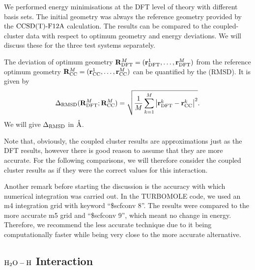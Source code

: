 \documentclass[8.5pt,twoside,twocolumn]{article}
\newcommand\dft{\enmat{_{\te{DFT}}}}
\newcommand\cc{\enmat{_{\te{CC}}}}
\renewcommand{\Ang}{\mathring{\te{A}}}
\renewcommand\r{\bo r}
\theoremstyle{standard}
\begin{document}
We performed energy minimisations at the DFT level of theory with different basis sets. The initial
geometry was always the reference geometry provided by the $\text{CCSD(T)-F12A}$ calculation. The results can be compared
to the coupled-cluster data with respect to optimum geometry and energy deviations. We will discuss
these for the three test systems separately.

The deviation of optimum geometry \mbox{$\bo R^M\dft=(\r^1\dft,\ldots,\r^M\dft)$} from the reference optimum geometry 
\mbox{$\bo R^M\cc=(\r^1\cc,\ldots,\r^M\cc)$} can be quantified by the  (RMSD). It
is given by
\newcommand{\DRMSD}{\Dl_{\te{RMSD}}}
\begin{equation}
\Dl_{\te{RMSD}}(\bo R^M\dft;\bo R^M\cc)=\sqrt{\frac 1 M \sum_{k=1}^M \abs{\r^k\dft-\r^k\cc}^2}.
\label{Bench:RMSD}
\end{equation}
We will give $\DRMSD$ in $\Ang$.   

Note that, obviously, the coupled cluster results are approximations just as the DFT results, however
there is good reason to assume that they are more accurate. For the following comparisons, we will
therefore consider the coupled cluster results as if they were the correct values for this
interaction.

Another remark before starting the discussion is the accuracy with which
numerical integration was carried out. In the \mbox{TURBOMOLE} code, we used an
m4 integration grid with keyword ``\$scfconv 8''. The results were compared to the more accurate
m5 grid and ``\$scfconv 9'', which meant no change in energy. Therefore, we recommend
the less accurate technique due to it being computationally faster while being
very close to the more accurate alternative.

\subsection{$\mbox{\ensuremath{\text H _2 \text O-\text H}}$ Interaction}
\end{document}
